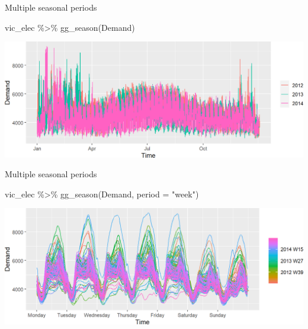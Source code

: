 \documentclass[14pt,ignorenonframetext,aspectratio=169]{beamer}
\newenvironment{Shaded}{\begin{snugshade}}{\end{snugshade}}
\newcommand{\AttributeTok}[1]{\textcolor[rgb]{0.77,0.63,0.00}{#1}}
\newcommand{\FunctionTok}[1]{\textcolor[rgb]{0.00,0.00,0.00}{#1}}
\newcommand{\NormalTok}[1]{#1}
\newcommand{\SpecialCharTok}[1]{\textcolor[rgb]{0.00,0.00,0.00}{#1}}
\newcommand{\StringTok}[1]{\textcolor[rgb]{0.31,0.60,0.02}{#1}}
\renewenvironment{Shaded}{\color{black}\begin{snugshade}\color{black}}{\end{snugshade}}
\renewenvironment{Shaded}{\color{black}\fontsize{10}{10}\sf\begin{snugshade}\color{black}}{\end{snugshade}}
\begin{document}
\begin{frame}[fragile]{Multiple seasonal periods}
\protect\hypertarget{multiple-seasonal-periods-1}{}
\fontsize{9}{9}\sf

\begin{Shaded}
\begin{Highlighting}[]
\NormalTok{vic\_elec }\SpecialCharTok{\%\textgreater{}\%} \FunctionTok{gg\_season}\NormalTok{(Demand)}
\end{Highlighting}
\end{Shaded}

\includegraphics{2-tsgraphics_files/figure-beamer/unnamed-chunk-18-1.png}
\end{frame}

\begin{frame}[fragile]{Multiple seasonal periods}
\protect\hypertarget{multiple-seasonal-periods-2}{}
\fontsize{9}{9}\sf

\begin{Shaded}
\begin{Highlighting}[]
\NormalTok{vic\_elec }\SpecialCharTok{\%\textgreater{}\%} \FunctionTok{gg\_season}\NormalTok{(Demand, }\AttributeTok{period =} \StringTok{"week"}\NormalTok{)}
\end{Highlighting}
\end{Shaded}

\includegraphics{2-tsgraphics_files/figure-beamer/unnamed-chunk-19-1.png}
\end{frame}
\end{document}
